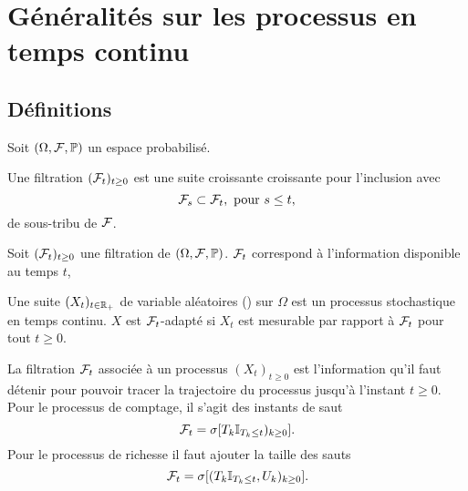 \section{Généralités sur les processus en temps continu}\label{sec:processus_continu}
\subsection{Définitions}\label{ssec:definitions}
Soit $(\Omega, \mathcal{F}, \mathbb{P})$ un espace probabilisé. 
\begin{definition}\label{def:filtration}
Une filtration $(\mathcal{F}_t)_{t\geq0}$ est une suite croissante croissante pour l'inclusion avec
$$
\mathcal{F}_s\subset \mathcal{F}_t,\text{ pour }s\leq t,
$$
de sous-tribu de $\mathcal{F}$.
\end{definition}
Soit $(\mathcal{F}_t)_{t\geq0}$ une filtration de $(\Omega, \mathcal{F}, \mathbb{P})$. $\mathcal{F}_t$ correspond à l'information disponible au temps $t$,
\begin{definition}\label{def:processus}
Une suite $(X_t)_{t\in \mathbb{R}_+}$ de variable aléatoires (\va) sur $\Omega$ est un processus stochastique en temps continu. $X$ est $\mathcal{F}_t$-adapté si $X_t$ est mesurable par rapport à $\mathcal{F}_t$ pour tout $t\geq0$. 
\end{definition}
\begin{remark}
La filtration $\mathcal{F}_t$ associée à un processus $(X_t)_{t\geq 0}$ est l'information qu'il faut détenir pour pouvoir tracer la trajectoire du processus jusqu'à l'instant $t\geq 0$. Pour le processus de comptage, il s'agit des instants de saut 
$$
\mathcal{F}_t = \sigma[T_k\mathbb{I}_{T_k \leq t})_{k\geq 0}].
$$
Pour le processus de richesse il faut ajouter la taille des sauts
$$
\mathcal{F}_t=\sigma[(T_k\mathbb{I}_{T_k \leq t}, U_k)_{k\geq 0}].
$$
\end{remark}

